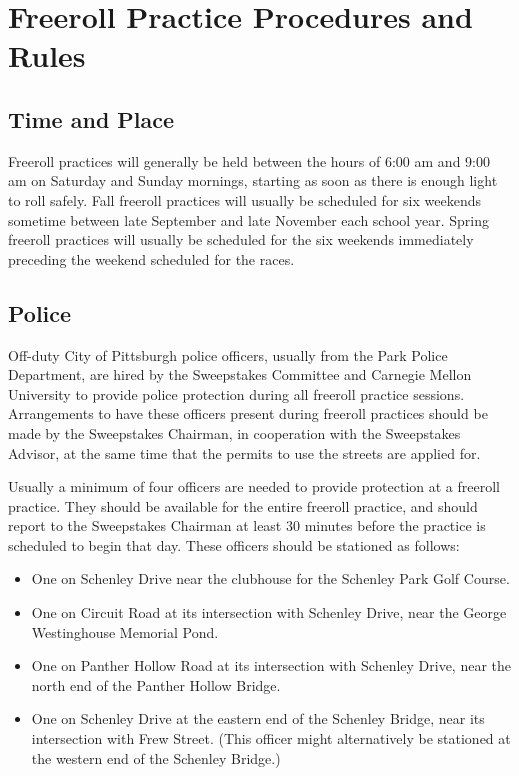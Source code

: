 \section{Freeroll Practice Procedures and Rules}

\subsection{Time and Place}

	Freeroll practices will generally be held between the hours of 6:00 am and
	9:00 am on Saturday and Sunday mornings, starting as soon as there is enough
	light to roll safely.  Fall freeroll practices will usually be scheduled for
	six weekends sometime between late September and late November each school
	year. Spring freeroll practices will usually be scheduled for the six weekends
	immediately preceding the weekend scheduled for the races.

\subsection{Police}

	Off-duty City of Pittsburgh police officers, usually from the Park Police
	Department, are hired by the Sweepstakes Committee and Carnegie Mellon
	University to provide police protection during all freeroll practice sessions.
	Arrangements to have these officers present during freeroll practices should be
	made by the Sweepstakes Chairman, in cooperation with the Sweepstakes Advisor,
	at the same time that the permits to use the streets are applied for.

	Usually a minimum of four officers are needed to provide protection at a
	freeroll practice. They should be available for the entire freeroll practice,
	and should report to the Sweepstakes Chairman at least 30 minutes before the
	practice is scheduled to begin that day. These officers should be stationed as
	follows:

	\begin{itemize}

		\item One on Schenley Drive near the clubhouse for the Schenley Park Golf
		Course.

		\item One on Circuit Road at its intersection with Schenley Drive, near the
		George Westinghouse Memorial Pond.

		\item One on Panther Hollow Road at its intersection with Schenley Drive,
		near the north end of the Panther Hollow Bridge.

		\item One on Schenley Drive at the eastern end of the Schenley Bridge, near
		its intersection with Frew Street. (This officer might alternatively be
		stationed at the western end of the Schenley Bridge.)

	\end{itemize}


